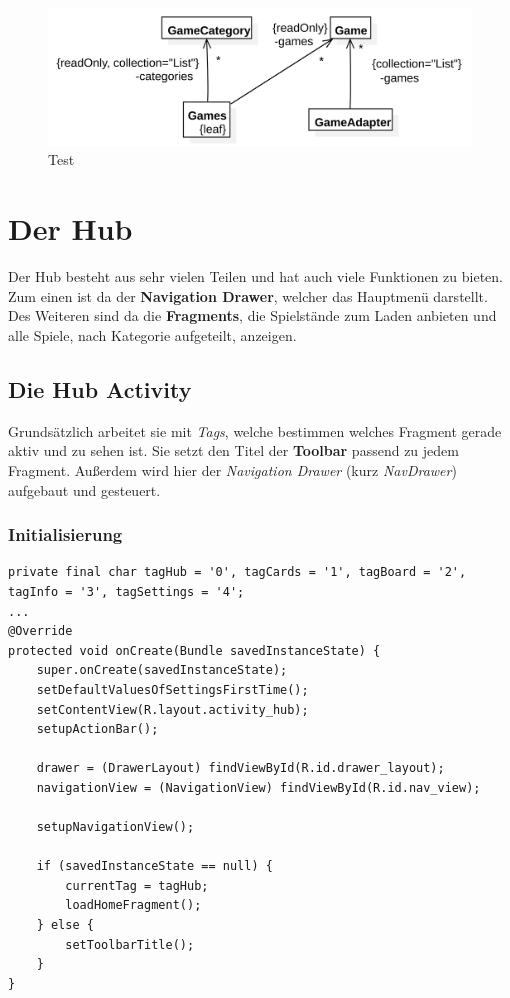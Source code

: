 \begin{figure}[h]
	\centering
	\includegraphics{resources/gamemanager/gamemanager_uml}
	\caption{Test}
	\label{fig:gm_uml}
\end{figure}

\section{Der Hub}
\sectionauthor{\leonard}

Der Hub besteht aus sehr vielen Teilen und hat auch viele Funktionen zu bieten.
Zum einen ist da der \textbf{Navigation Drawer}, welcher das Hauptmenü
darstellt. Des Weiteren sind da die \textbf{Fragments}, die Spielstände zum
Laden anbieten und alle Spiele, nach Kategorie aufgeteilt, anzeigen.

\subsection{Die Hub Activity}

Grundsätzlich arbeitet sie mit \emph{Tags}, welche bestimmen welches Fragment
gerade aktiv und zu sehen ist. Sie setzt den Titel der \textbf{Toolbar} passend
zu jedem Fragment. Außerdem wird hier der \emph{Navigation Drawer}
(kurz \emph{NavDrawer}) aufgebaut und gesteuert.

\subsubsection{Initialisierung}

\begin{lstlisting}[caption={Hub onCreate() Methode},captionpos=b]
private final char tagHub = '0', tagCards = '1', tagBoard = '2', tagInfo = '3', tagSettings = '4';
...
@Override
protected void onCreate(Bundle savedInstanceState) {
	super.onCreate(savedInstanceState);
	setDefaultValuesOfSettingsFirstTime();
	setContentView(R.layout.activity_hub);
	setupActionBar();

	drawer = (DrawerLayout) findViewById(R.id.drawer_layout);
	navigationView = (NavigationView) findViewById(R.id.nav_view);

	setupNavigationView();

	if (savedInstanceState == null) {
		currentTag = tagHub;
		loadHomeFragment();
	} else {
		setToolbarTitle();
	}
}
\end{lstlisting}

